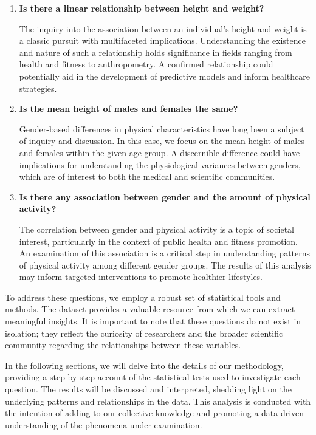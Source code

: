 \documentclass[
]{article}
\begin{document}
\begin{enumerate}
\def\labelenumi{\arabic{enumi}.}
\item
  \textbf{Is there a linear relationship between height and weight?}

  The inquiry into the association between an individual's height and weight is a classic pursuit with multifaceted implications. Understanding the existence and nature of such a relationship holds significance in fields ranging from health and fitness to anthropometry. A confirmed relationship could potentially aid in the development of predictive models and inform healthcare strategies.
\item
  \textbf{Is the mean height of males and females the same?}

  Gender-based differences in physical characteristics have long been a subject of inquiry and discussion. In this case, we focus on the mean height of males and females within the given age group. A discernible difference could have implications for understanding the physiological variances between genders, which are of interest to both the medical and scientific communities.
\item
  \textbf{Is there any association between gender and the amount of physical activity?}

  The correlation between gender and physical activity is a topic of societal interest, particularly in the context of public health and fitness promotion. An examination of this association is a critical step in understanding patterns of physical activity among different gender groups. The results of this analysis may inform targeted interventions to promote healthier lifestyles.
\end{enumerate}

To address these questions, we employ a robust set of statistical tools and methods. The dataset provides a valuable resource from which we can extract meaningful insights. It is important to note that these questions do not exist in isolation; they reflect the curiosity of researchers and the broader scientific community regarding the relationships between these variables.

In the following sections, we will delve into the details of our methodology, providing a step-by-step account of the statistical tests used to investigate each question. The results will be discussed and interpreted, shedding light on the underlying patterns and relationships in the data. This analysis is conducted with the intention of adding to our collective knowledge and promoting a data-driven understanding of the phenomena under examination.
\end{document}

